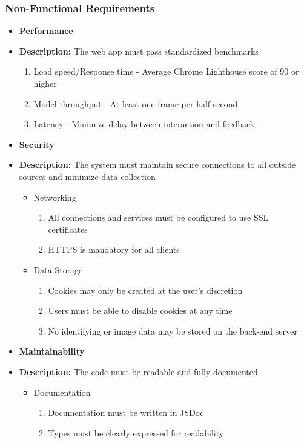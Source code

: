 \documentclass[thesis]{fputhesis}
\begin{document}
\begin{body}
\subsubsection{Non-Functional Requirements}
\begin{itemize}
    \item \textbf{Performance}
    \item[] \textbf{Description:} The web app must pass standardized benchmarks
    \begin{enumerate}
        \item[\textbullet] Load speed/Response time - Average Chrome Lighthouse score of 90 or higher
        \item[\textbullet] Model throughput - At least one frame per half second
        \item[\textbullet] Latency - Minimize delay between interaction and feedback
    \end{enumerate}
    \item \textbf{Security}
    \item[] \textbf{Description:} The system must maintain secure connections to all outside sources and minimize data collection
    \begin{itemize}
        \item[\textbullet] Networking
        \begin{enumerate}
            \item[\textbullet] All connections and services must be configured to use SSL certificates
            \item[\textbullet] HTTPS is mandatory for all clients
        \end{enumerate}
        \item[\textbullet] Data Storage
        \begin{enumerate}
            \item[\textbullet] Cookies may only be created at the user's discretion
            \item[\textbullet] Users must be able to disable cookies at any time
            \item[\textbullet] No identifying or image data may be stored on the back-end server
        \end{enumerate}
    \end{itemize}
    \item \textbf{Maintainability}
    \item[] \textbf{Description:} The code must be readable and fully documented.
    \begin{itemize}
        \item[\textbullet] Documentation
        \begin{enumerate}
            \item[\textbullet] Documentation must be written in JSDoc
            \item[\textbullet] Types must be clearly expressed for readability
        \end{enumerate}
    \end{itemize}
\end{itemize}


\end{body}
\end{document}
